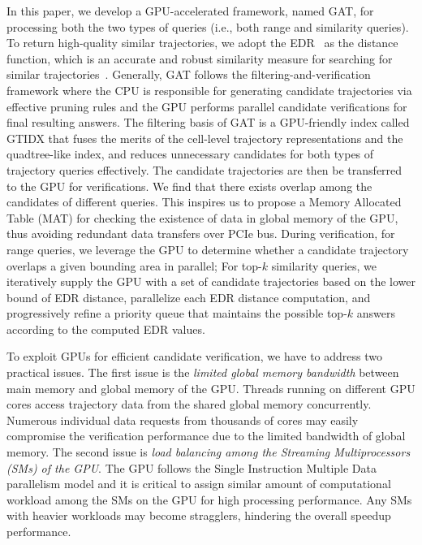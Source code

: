 \documentclass[10pt,conference,letterpaper]{IEEEtran}
\newcommand{\frname}{GAT\xspace }
\newcommand{\idxname}{GTIDX\xspace }
\begin{document}
In this paper, we develop a GPU-accelerated framework, named \frname, for processing both the two types of queries (i.e., both range and similarity queries).
To return high-quality similar trajectories, we adopt the EDR~\cite{DBLP:conf/sigmod/ChenOO05} as the distance function, which is an accurate and robust similarity measure for searching for similar trajectories~\cite{EDWP15}.
Generally, \frname follows the filtering-and-verification framework where the CPU is responsible for generating candidate trajectories via effective pruning rules and the GPU performs parallel candidate verifications for final resulting answers.
The filtering basis of \frname is a GPU-friendly index called \idxname that fuses the merits of the cell-level trajectory representations and the quadtree-like index, and reduces unnecessary candidates for both types of trajectory queries effectively.
The candidate trajectories are then be transferred to the GPU for verifications. We find that there exists overlap among the candidates of different queries. This inspires us to propose a Memory Allocated Table (MAT) for checking the existence of data in global memory of the GPU, thus avoiding redundant data transfers over PCIe bus.
During verification, for range queries, we leverage the GPU to determine whether a candidate trajectory overlaps a given bounding area in parallel; For top-$k$ similarity queries, we iteratively supply the GPU with a set of candidate trajectories based on the lower bound of EDR distance, parallelize each EDR distance computation, and progressively refine a priority queue that maintains the possible top-$k$ answers according to the computed EDR values.

To exploit GPUs for efficient candidate verification, we have to address two practical issues.
The first issue is the \emph{limited global memory bandwidth} between main memory and global memory of the GPU.
Threads running on different GPU cores access trajectory data from the shared global memory concurrently. Numerous individual data requests from thousands of cores may easily compromise the verification performance due to the limited bandwidth of global memory.
The second issue is \emph{load balancing among the Streaming Multiprocessors (SMs) of the GPU}. The GPU follows the Single Instruction Multiple Data parallelism model and it is critical to assign similar amount of computational workload among the SMs on the GPU for high processing performance. Any SMs with heavier workloads may become stragglers, hindering the overall speedup performance.
\end{document}

